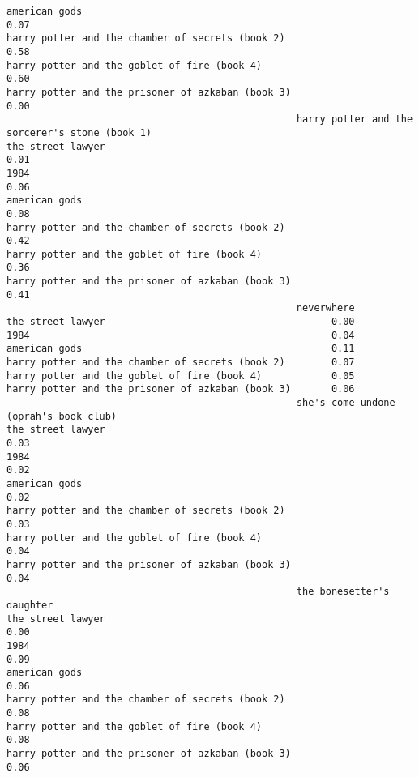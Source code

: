 \documentclass[
]{report}
\begin{document}
\begin{verbatim}
american gods                                                                                  0.07
harry potter and the chamber of secrets (book 2)                                               0.58
harry potter and the goblet of fire (book 4)                                                   0.60
harry potter and the prisoner of azkaban (book 3)                                              0.00
                                                  harry potter and the sorcerer's stone (book 1)
the street lawyer                                                                           0.01
1984                                                                                        0.06
american gods                                                                               0.08
harry potter and the chamber of secrets (book 2)                                            0.42
harry potter and the goblet of fire (book 4)                                                0.36
harry potter and the prisoner of azkaban (book 3)                                           0.41
                                                  neverwhere
the street lawyer                                       0.00
1984                                                    0.04
american gods                                           0.11
harry potter and the chamber of secrets (book 2)        0.07
harry potter and the goblet of fire (book 4)            0.05
harry potter and the prisoner of azkaban (book 3)       0.06
                                                  she's come undone (oprah's book club)
the street lawyer                                                                  0.03
1984                                                                               0.02
american gods                                                                      0.02
harry potter and the chamber of secrets (book 2)                                   0.03
harry potter and the goblet of fire (book 4)                                       0.04
harry potter and the prisoner of azkaban (book 3)                                  0.04
                                                  the bonesetter's daughter
the street lawyer                                                      0.00
1984                                                                   0.09
american gods                                                          0.06
harry potter and the chamber of secrets (book 2)                       0.08
harry potter and the goblet of fire (book 4)                           0.08
harry potter and the prisoner of azkaban (book 3)                      0.06

\end{verbatim}
\end{document}
